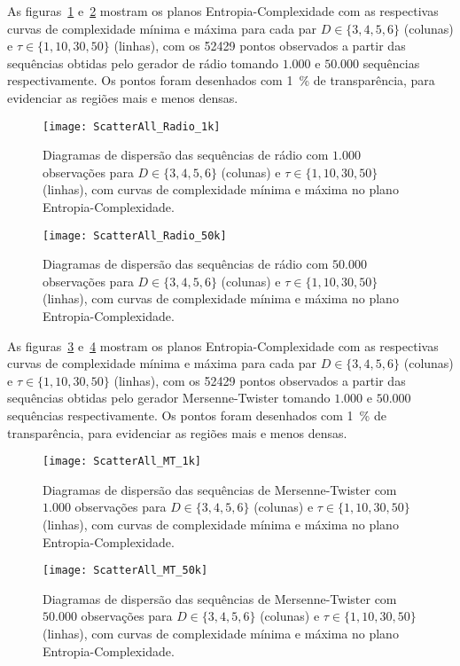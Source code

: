As figuras~\ref{Fig:ScatterAll_Radio_1k} e~\ref{Fig:ScatterAll_Radio_50k} mostram os planos Entropia-Complexidade com as respectivas curvas de complexidade mínima e máxima para cada par $D\in\{3,4,5,6\}$ (colunas) e $\tau\in\{1,10,30,50\}$ (linhas), com os \num{52429} pontos observados a partir das sequências obtidas pelo gerador de rádio tomando $1.000$ e $50.000$ sequências respectivamente.
Os pontos foram desenhados com \SI{1}{\percent} de transparência, para evidenciar as regiões mais e menos densas.

\begin{figure}[hbt]
	\centering
	\texttt{[image: ScatterAll\_Radio\_1k]}
	\caption{Diagramas de dispersão das sequências de rádio com $1.000$ observações para $D\in\{3,4,5,6\}$ (colunas) e $\tau\in\{1,10,30,50\}$ (linhas), com curvas de complexidade mínima e máxima no plano Entropia-Complexidade.}\label{Fig:ScatterAll_Radio_1k}
\end{figure}

\begin{figure}[hbt]
	\centering
	\texttt{[image: ScatterAll\_Radio\_50k]}
	\caption{Diagramas de dispersão das sequências de rádio com $50.000$ observações para $D\in\{3,4,5,6\}$ (colunas) e $\tau\in\{1,10,30,50\}$ (linhas), com curvas de complexidade mínima e máxima no plano Entropia-Complexidade.}\label{Fig:ScatterAll_Radio_50k}
\end{figure}

As figuras~\ref{Fig:ScatterAll_MT_1k} e~\ref{Fig:ScatterAll_MT_50k} mostram os planos Entropia-Complexidade com as respectivas curvas de complexidade mínima e máxima para cada par $D\in\{3,4,5,6\}$ (colunas) e $\tau\in\{1,10,30,50\}$ (linhas), com os \num{52429} pontos observados a partir das sequências obtidas pelo gerador Mersenne-Twister tomando $1.000$ e $50.000$ sequências respectivamente.
Os pontos foram desenhados com \SI{1}{\percent} de transparência, para evidenciar as regiões mais e menos densas.

\begin{figure}[hbt]
	\centering
	\texttt{[image: ScatterAll\_MT\_1k]}
	\caption{Diagramas de dispersão das sequências de Mersenne-Twister com $1.000$ observações para $D\in\{3,4,5,6\}$ (colunas) e $\tau\in\{1,10,30,50\}$ (linhas), com curvas de complexidade mínima e máxima no plano Entropia-Complexidade.}\label{Fig:ScatterAll_MT_1k}
\end{figure}

\begin{figure}[hbt]
	\centering
	\texttt{[image: ScatterAll\_MT\_50k]}
	\caption{Diagramas de dispersão das sequências de Mersenne-Twister com $50.000$ observações para $D\in\{3,4,5,6\}$ (colunas) e $\tau\in\{1,10,30,50\}$ (linhas), com curvas de complexidade mínima e máxima no plano Entropia-Complexidade.}\label{Fig:ScatterAll_MT_50k}
\end{figure}

